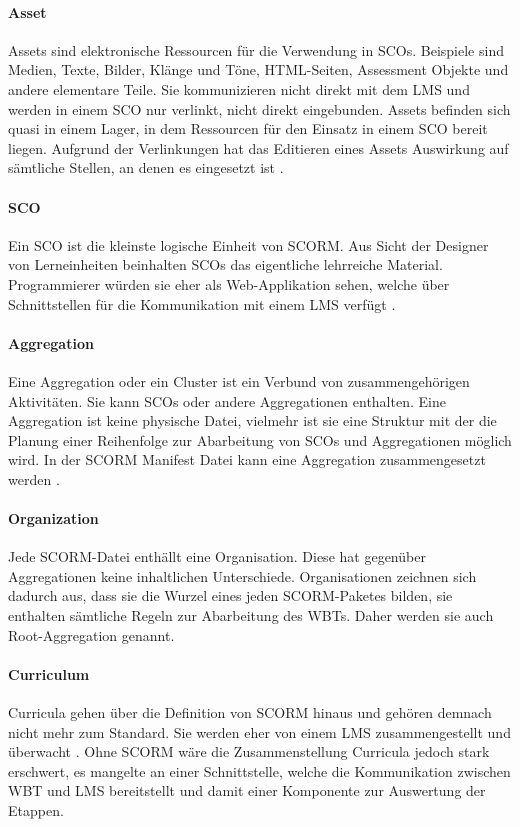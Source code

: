\paragraph{Asset}
Assets sind elektronische Ressourcen für die Verwendung in SCOs. Beispiele sind
Medien, Texte, Bilder, Klänge und Töne, HTML-Seiten, Assessment Objekte und
andere elementare Teile. Sie kommunizieren nicht direkt mit dem LMS und werden
in einem SCO nur verlinkt, nicht direkt eingebunden. Assets befinden sich quasi
in einem Lager, in dem Ressourcen für den Einsatz in einem SCO bereit liegen.
Aufgrund der Verlinkungen hat das Editieren eines Assets Auswirkung auf
sämtliche Stellen, an denen es eingesetzt ist \cite{adl:2011}.

\paragraph{SCO}
Ein \ac{SCO} ist die kleinste logische Einheit von SCORM. Aus Sicht
der Designer von Lerneinheiten beinhalten SCOs das eigentliche
lehrreiche Material. Programmierer würden sie eher als
Web-Applikation sehen, welche über Schnittstellen für die
Kommunikation mit einem LMS verfügt \cite{adl:2011}.

\paragraph{Aggregation}
Eine Aggregation oder ein Cluster ist ein Verbund von zusammengehörigen
Aktivitäten. Sie kann SCOs oder andere Aggregationen enthalten. Eine Aggregation
ist keine physische Datei, vielmehr ist sie eine Struktur mit der die Planung
einer Reihenfolge zur Abarbeitung von SCOs und Aggregationen möglich wird. In
der SCORM Manifest Datei kann eine Aggregation zusammengesetzt werden
\cite{adl:2011}.

\paragraph{Organization}
Jede SCORM-Datei enthällt eine Organisation. Diese hat gegenüber Aggregationen
keine inhaltlichen Unterschiede. Organisationen zeichnen sich dadurch aus, dass
sie die Wurzel eines jeden SCORM-Paketes bilden, sie enthalten sämtliche Regeln
zur Abarbeitung des WBTs. Daher werden sie auch Root-Aggregation genannt.
\cite{adl:2011}

\paragraph{Curriculum}
Curricula gehen über die Definition von SCORM hinaus und gehören demnach nicht
mehr zum Standard. Sie werden eher von einem LMS zusammengestellt und überwacht
\cite{adl:2011}. Ohne SCORM wäre die Zusammenstellung Curricula jedoch stark
erschwert, es mangelte an einer Schnittstelle, welche die Kommunikation zwischen
WBT und LMS bereitstellt und damit einer Komponente zur Auswertung der
Etappen.

